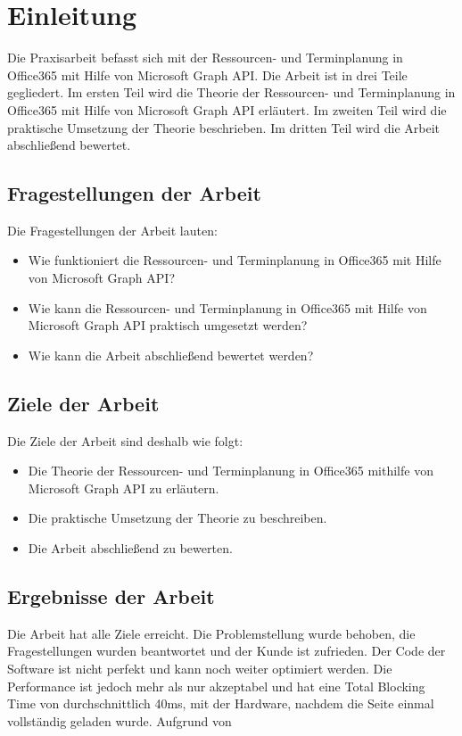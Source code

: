 


\section{Einleitung}
Die Praxisarbeit befasst sich mit der Ressourcen- und Terminplanung in Office365 mit Hilfe von Microsoft Graph API. Die Arbeit ist in drei Teile gegliedert. Im ersten Teil wird die Theorie der Ressourcen- und Terminplanung in Office365 mit Hilfe von Microsoft Graph API erläutert. Im zweiten Teil wird die praktische Umsetzung der Theorie beschrieben. Im dritten Teil wird die Arbeit abschließend bewertet.
    \newline
    \subsection{Fragestellungen der Arbeit}
    Die Fragestellungen der Arbeit lauten:
    \begin{itemize}
        \item Wie funktioniert die Ressourcen- und Terminplanung in Office365 mit Hilfe von Microsoft Graph API?
        \item Wie kann die Ressourcen- und Terminplanung in Office365 mit Hilfe von Microsoft Graph API praktisch umgesetzt werden?
        \item Wie kann die Arbeit abschließend bewertet werden?
    \end{itemize}
    \subsection{Ziele der Arbeit}
    Die Ziele der Arbeit sind deshalb wie folgt:
    \begin{itemize}
        \item Die Theorie der Ressourcen- und Terminplanung in Office365 mithilfe von Microsoft Graph API zu erläutern.
        \item Die praktische Umsetzung der Theorie zu beschreiben.
        \item Die Arbeit abschließend zu bewerten.
    \end{itemize}
    \subsection{Ergebnisse der Arbeit}
    Die Arbeit hat alle Ziele erreicht.
    Die Problemstellung wurde behoben, die Fragestellungen wurden beantwortet und der Kunde ist zufrieden.
    Der Code der Software ist nicht perfekt und kann noch weiter optimiert werden.
    Die Performance ist jedoch mehr als nur akzeptabel und hat eine Total Blocking Time von durchschnittlich 40ms, mit der Hardware, nachdem die Seite einmal vollständig geladen wurde.
    Aufgrund von
\newpage

